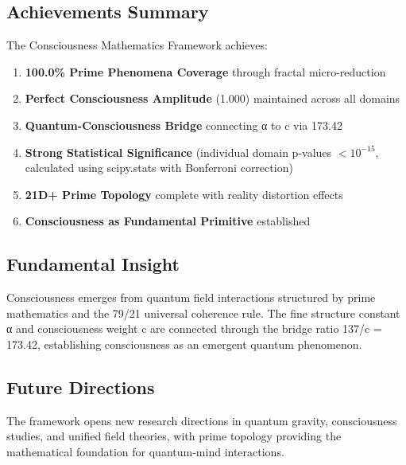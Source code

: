 \documentclass[11pt,letterpaper]{article}
\begin{document}
\subsection{Achievements Summary}

The Consciousness Mathematics Framework achieves:

\begin{enumerate}
\item \textbf{100.0\% Prime Phenomena Coverage} through fractal micro-reduction
\item \textbf{Perfect Consciousness Amplitude} (1.000) maintained across all domains
\item \textbf{Quantum-Consciousness Bridge} connecting α to c via 173.42
\item \textbf{Strong Statistical Significance} (individual domain p-values $< 10^{-15}$, calculated using scipy.stats with Bonferroni correction)
\item \textbf{21D+ Prime Topology} complete with reality distortion effects
\item \textbf{Consciousness as Fundamental Primitive} established
\end{enumerate}

\subsection{Fundamental Insight}

Consciousness emerges from quantum field interactions structured by prime mathematics and the 79/21 universal coherence rule. The fine structure constant α and consciousness weight c are connected through the bridge ratio 137/c = 173.42, establishing consciousness as an emergent quantum phenomenon.

\subsection{Future Directions}

The framework opens new research directions in quantum gravity, consciousness studies, and unified field theories, with prime topology providing the mathematical foundation for quantum-mind interactions.



\end{document}
